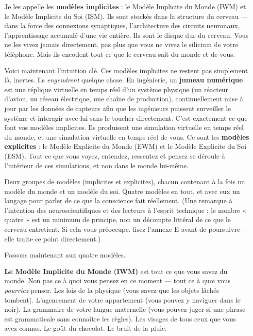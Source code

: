 \documentclass[11pt, twoside, openright]{book}
\begin{document}
Je les appelle les \textbf{modèles implicites} : le Modèle Implicite du Monde (IWM) et le Modèle Implicite du Soi (ISM). Ils sont stockés dans la structure du cerveau --- dans la force des connexions synaptiques, l'architecture des circuits neuronaux, l'apprentissage accumulé d'une vie entière. Ils sont le disque dur du cerveau. Vous ne les vivez jamais directement, pas plus que vous ne vivez le silicium de votre téléphone. Mais ils encodent tout ce que le cerveau sait du monde et de vous.

Voici maintenant l'intuition clé. Ces modèles implicites ne restent pas simplement là, inertes. Ils \textit{engendrent} quelque chose. En ingénierie, un \textbf{jumeau numérique} est une réplique virtuelle en temps réel d'un système physique (un réacteur d'avion, un réseau électrique, une chaîne de production), continuellement mise à jour par les données de capteurs afin que les ingénieurs puissent surveiller le système et interagir avec lui sans le toucher directement. C'est exactement ce que font vos modèles implicites. Ils produisent une simulation virtuelle en temps réel du monde, et une simulation virtuelle en temps réel de vous. Ce sont les \textbf{modèles explicites} : le Modèle Explicite du Monde (EWM) et le Modèle Explicite du Soi (ESM). Tout ce que vous voyez, entendez, ressentez et pensez se déroule à l'intérieur de ces simulations, et non dans le monde lui-même.

Deux groupes de modèles (implicites et explicites), chacun contenant à la fois un modèle du monde et un modèle du soi. Quatre modèles en tout, et avec eux un langage pour parler de ce que la conscience fait réellement. (Une remarque à l'intention des neuroscientifiques et des lecteurs à l'esprit technique : le nombre « quatre » est un minimum de principe, non un décompte littéral de ce que le cerveau entretient. Si cela vous préoccupe, lisez l'annexe E avant de poursuivre --- elle traite ce point directement.)

Passons maintenant aux quatre modèles.

\textbf{Le Modèle Implicite du Monde (IWM)} est tout ce que vous savez du monde. Non pas ce à quoi vous pensez en ce moment --- tout ce à quoi vous \textit{pourriez} penser. Les lois de la physique (vous savez que les objets lâchés tombent). L'agencement de votre appartement (vous pouvez y naviguer dans le noir). La grammaire de votre langue maternelle (vous pouvez juger si une phrase est grammaticale sans connaître les règles). Les visages de tous ceux que vous avez connus. Le goût du chocolat. Le bruit de la pluie.
\end{document}
